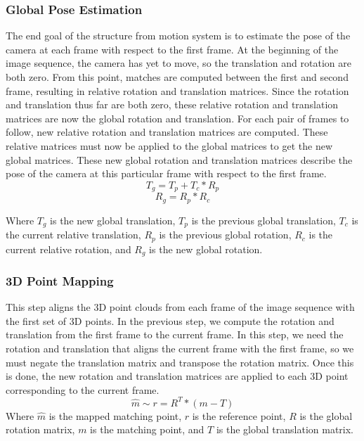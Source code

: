 \subsubsection{Global Pose Estimation}
	The end goal of the structure from motion system is to estimate the pose of the camera at each frame with respect to the first frame. At the beginning of the image sequence, the camera has yet to move, so the translation and rotation are both zero. From this point, matches are computed between the first and second frame, resulting in relative rotation and translation matrices. Since the rotation and translation thus far are both zero, these relative rotation and translation matrices are now the global rotation and translation. For each pair of frames to follow, new relative rotation and translation matrices are computed. These relative matrices must now be applied to the global matrices to get the new global matrices. These new global rotation and translation matrices describe the pose of the camera at this particular frame with respect to the first frame.
$$T_g = T_p + T_c * R_p$$
$$R_g = R_p * R_c$$

Where $T_{g}$ is the new global translation, $T_{p}$ is the previous global translation, $T_{c}$ is the current relative translation, $R_{p}$ is the previous global rotation, $R_{c}$ is the current relative rotation, and $R_{g}$ is the new global rotation.

\subsubsection{3D Point Mapping}
	This step aligns the 3D point clouds from each frame of the image sequence with the first set of 3D points. In the previous step, we compute the rotation and translation from the first frame to the current frame. In this step, we need the rotation and translation that aligns the current frame with the first frame, so we must negate the translation matrix and transpose the rotation matrix. Once this is done, the new rotation and translation matrices are applied to each 3D point corresponding to the current frame.
\begin{displaymath}
\hat{m} \sim r = R^T * (m-T)
\end{displaymath}
Where $\hat{m}$ is the mapped matching point, $r$ is the reference point, $R$ is the global rotation matrix, $m$ is the matching point, and $T$ is the global translation matrix.
